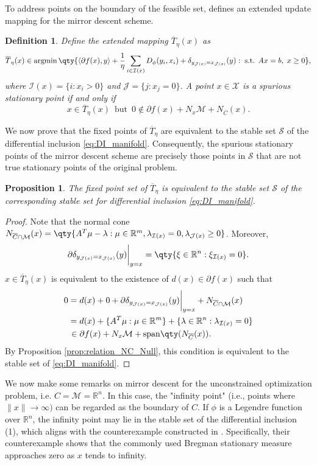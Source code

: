 \documentclass[11pt]{article}
\newcommand{\argmin}{\mathop{\rm argmin}}
\newcommand{\R}{\mathbb R}
\newcommand{\cI}{\mathcal I}
\newcommand{\cJ}{\mathcal J}
\newcommand{\cM}{\mathcal M}
\newcommand{\cS}{\mathcal S}
\def\inner#1{\left\langle#1\right\rangle}
\newtheorem{definition}{Definition}[section]
\newtheorem{proposition}{Proposition}[section]
\begin{document}
To address points on the boundary of the feasible set, \cite{chen2024spurious} defines an extended update mapping for the mirror descent scheme.

\begin{definition} 
Define the extended mapping \( \overline{T}_\eta(x) \) as 
\[
\overline{T}_\eta(x)\in\argmin\qty{\inner{\partial f(x),y} + \frac{1}{\eta} \sum_{i \in \mathcal{I}(x)} D_\phi(y_i, x_i) + \delta_{{y}_{\mathcal{J}(x)} = x_{\mathcal{J}(x)}}(y):\;\text{s.t. } Ax=b,\;x\geq0},
\]
where $\cI(x)=\{i:x_i>0\}$ and $\cJ=\{j:x_j=0\}$. A point \(x \in \mathcal{X}\) is a spurious stationary point if and only if
\[
x\in\overline{T}_\eta(x) \, \text{ but } \, 0 \notin \partial f(x)+N_x\cM+N_{\overline{C}}(x).
\]
\end{definition}
We now prove that the fixed points of $ \overline{T}_\eta $ are equivalent to the stable set $ \mathcal{S} $ of the differential inclusion \eqref{eq:DI_manifold}. Consequently, the spurious stationary points of the mirror descent scheme are precisely those points in $ \mathcal{S} $ that are not true stationary points of the original problem.
\begin{proposition}
The fixed point set of $\overline{T}_\eta$ is equivalent to the stable set $\cS$ of the corresponding stable set for differential inclusion \eqref{eq:DI_manifold}.
\end{proposition}
\begin{proof}
Note that the normal cone  $N_{\overline{C}\cap\cM}(x)=\qty{A^T\mu-\lambda:\mu\in\R^m,\lambda_{\cI(x)}=0,\lambda_{\cJ(x)}\geq0}$. Moreover, 
\[
\partial\delta_{{y}_{\mathcal{J}(x)} = x_{\mathcal{J}(x)}}(y)\bigg|_{y=x}=\qty{\xi\in\R^n:\xi_{\cI(x)}=0}.
\]
$x\in\overline{T}_\eta(x)$ is equivalent to the existence of $d(x)\in\partial f(x)$ such that 
\[
\begin{aligned}
0=&\;d(x)+0+\partial\delta_{{y}_{\mathcal{J}(x)} = x_{\mathcal{J}(x)}}(y)\bigg|_{y=x}+N_{\overline{C}\cap\cM}(x)\\
=&\;d(x)+\{A^T\mu:\mu\in\R^m\}+\{\lambda\in\R^n:\lambda_{\cI(x)}=0\}\\
\in&\;\partial f(x)+N_x\cM+{\rm span}\qty(N_{\overline{C}}(x)).
\end{aligned}
\]
By Proposition \ref{prop:relation_NC_Null}, this condition is equivalent to the stable set of \eqref{eq:DI_manifold}. 
\end{proof}


We now make some remarks on mirror descent for the unconstrained optimization problem, i.e. $C=\cM=\R^n$. In this case, the "infinity point" (i.e., points where \(\|x\| \to \infty)\) can be regarded as the boundary of \( C \). If \(\phi\) is a Legendre function over \(\mathbb{R}^n\), the infinity point may lie in the stable set of the differential inclusion (1), which aligns with the counterexample constructed in \cite{zhang2024stochastic}. Specifically, their counterexample shows that the commonly used Bregman stationary measure approaches zero as \( x \) tends to infinity.
\end{document}
